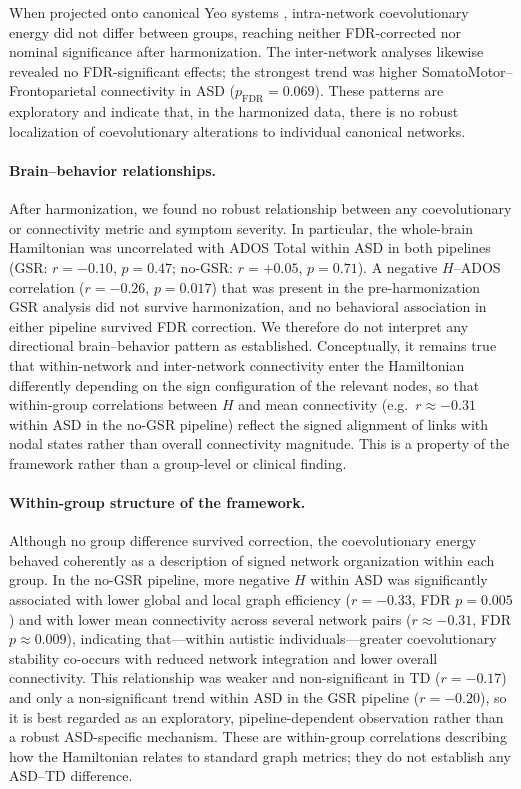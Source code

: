 \documentclass[10pt,letterpaper]{article}
\begin{document}
When projected onto canonical Yeo systems \cite{Yeo2011}, intra-network coevolutionary energy did
not differ between groups, reaching neither FDR-corrected nor nominal significance after
harmonization. The inter-network analyses likewise revealed no FDR-significant effects; the strongest
trend was higher SomatoMotor--Frontoparietal connectivity in ASD ($p_{\mathrm{FDR}} = 0.069$). These
patterns are exploratory and indicate that, in the harmonized data, there is no robust localization
of coevolutionary alterations to individual canonical networks.

\paragraph*{Brain--behavior relationships.}
After harmonization, we found no robust relationship between any coevolutionary or connectivity
metric and symptom severity. In particular, the whole-brain Hamiltonian was uncorrelated with ADOS
Total within ASD in both pipelines (GSR: $r = -0.10$, $p = 0.47$; no-GSR: $r = +0.05$, $p = 0.71$).
A negative $H$--ADOS correlation ($r = -0.26$, $p = 0.017$) that was present in the pre-harmonization
GSR analysis did not survive harmonization, and no behavioral association in either pipeline survived
FDR correction. We therefore do not interpret any directional brain--behavior pattern as established.
Conceptually, it remains true that within-network and inter-network connectivity enter the
Hamiltonian differently depending on the sign configuration of the relevant nodes, so that
within-group correlations between $H$ and mean connectivity (e.g.\ $r \approx -0.31$ within ASD in
the no-GSR pipeline) reflect the signed alignment of links with nodal states rather than overall
connectivity magnitude. This is a property of the framework rather than a group-level or
clinical finding.

\paragraph*{Within-group structure of the framework.}
Although no group difference survived correction, the coevolutionary energy behaved coherently as a
description of signed network organization within each group. In the no-GSR pipeline, more negative
$H$ within ASD was significantly associated with lower global and local graph efficiency
($r = -0.33$, FDR $p = 0.005$) and with lower mean connectivity across several network pairs
($r \approx -0.31$, FDR $p \approx 0.009$), indicating that---within autistic individuals---greater
coevolutionary stability co-occurs with reduced network integration and lower overall connectivity.
This relationship was weaker and non-significant in TD ($r = -0.17$) and only a non-significant trend
within ASD in the GSR pipeline ($r = -0.20$), so it is best regarded as an exploratory,
pipeline-dependent observation rather than a robust ASD-specific mechanism. These are within-group
correlations describing how the Hamiltonian relates to standard graph metrics; they do not establish
any ASD--TD difference.
\end{document}
